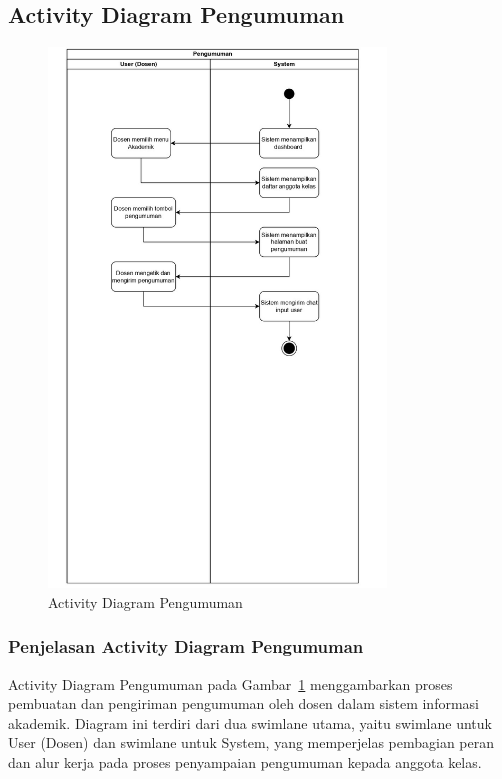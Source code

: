 \documentclass[a4paper,oneside,11pt]{book}
\begin{document}
\subsection{Activity Diagram Pengumuman}
\begin{figure}[H]
  \centering
  \includegraphics[width=0.8\textwidth]{Activity Diagram/Pengumuman.jpg}
  \caption{Activity Diagram Pengumuman}
  \label{fig:activity_pengumuman}
\end{figure}
\subsubsection{Penjelasan Activity Diagram Pengumuman}
Activity Diagram Pengumuman pada Gambar~\ref{fig:activity_pengumuman} menggambarkan proses pembuatan dan pengiriman pengumuman oleh dosen dalam sistem informasi akademik. Diagram ini terdiri dari dua swimlane utama, yaitu swimlane untuk User (Dosen) dan swimlane untuk System, yang memperjelas pembagian peran dan alur kerja pada proses penyampaian pengumuman kepada anggota kelas.
\end{document}
